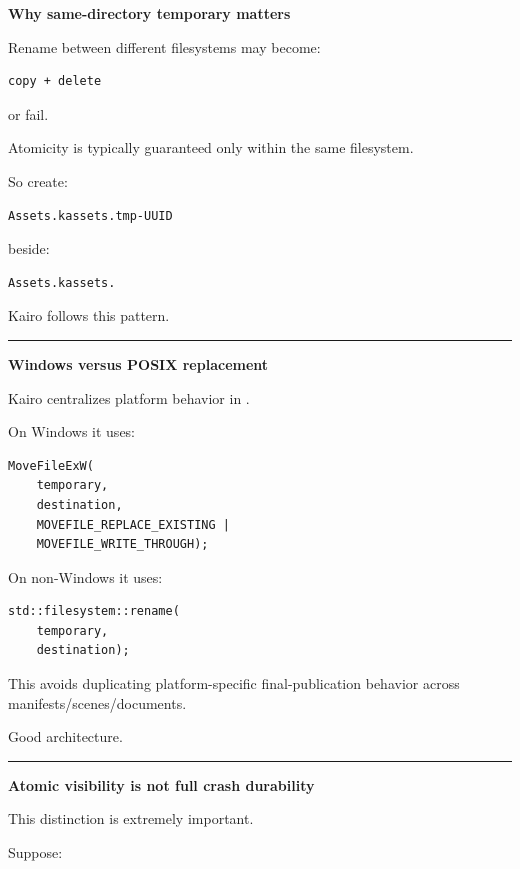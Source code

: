 \textbf{Why same-directory temporary matters}

Rename between different filesystems may become:

\begin{verbatim}
copy + delete
\end{verbatim}

or fail.

Atomicity is typically guaranteed only within the same filesystem.

So create:

\begin{verbatim}
Assets.kassets.tmp-UUID
\end{verbatim}

beside:

\begin{verbatim}
Assets.kassets.
\end{verbatim}

Kairo follows this pattern.

\begin{center}\rule{0.5\linewidth}{0.5pt}\end{center}

\textbf{Windows versus POSIX replacement}

Kairo centralizes platform behavior in .

On Windows it uses:

\begin{verbatim}
MoveFileExW(
    temporary,
    destination,
    MOVEFILE_REPLACE_EXISTING |
    MOVEFILE_WRITE_THROUGH);
\end{verbatim}

On non-Windows it uses:

\begin{verbatim}
std::filesystem::rename(
    temporary,
    destination);
\end{verbatim}

This avoids duplicating platform-specific final-publication behavior across manifests/scenes/documents.

Good architecture.

\begin{center}\rule{0.5\linewidth}{0.5pt}\end{center}

\textbf{Atomic visibility is not full crash durability}

This distinction is extremely important.

Suppose:

